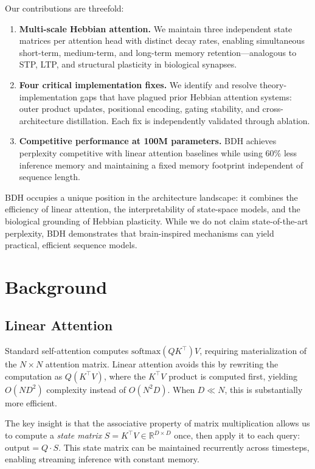 \documentclass{article}
\begin{document}
Our contributions are threefold:

\begin{enumerate}
    \item \textbf{Multi-scale Hebbian attention.} We maintain three independent state matrices per attention head with distinct decay rates, enabling simultaneous short-term, medium-term, and long-term memory retention---analogous to STP, LTP, and structural plasticity in biological synapses.
    \item \textbf{Four critical implementation fixes.} We identify and resolve theory-implementation gaps that have plagued prior Hebbian attention systems: outer product updates, positional encoding, gating stability, and cross-architecture distillation. Each fix is independently validated through ablation.
    \item \textbf{Competitive performance at 100M parameters.} BDH achieves perplexity competitive with linear attention baselines while using 60\% less inference memory and maintaining a fixed memory footprint independent of sequence length.
\end{enumerate}

BDH occupies a unique position in the architecture landscape: it combines the efficiency of linear attention, the interpretability of state-space models, and the biological grounding of Hebbian plasticity. While we do not claim state-of-the-art perplexity, BDH demonstrates that brain-inspired mechanisms can yield practical, efficient sequence models.

\section{Background}

\subsection{Linear Attention}

Standard self-attention computes $\text{softmax}(QK^\top)V$, requiring materialization of the $N \times N$ attention matrix. Linear attention \citep{katharopoulos2018transformers} avoids this by rewriting the computation as $Q(K^\top V)$, where the $K^\top V$ product is computed first, yielding $O(ND^2)$ complexity instead of $O(N^2D)$. When $D \ll N$, this is substantially more efficient.

The key insight is that the associative property of matrix multiplication allows us to compute a \textit{state matrix} $S = K^\top V \in \mathbb{R}^{D \times D}$ once, then apply it to each query: $\text{output} = Q \cdot S$. This state matrix can be maintained recurrently across timesteps, enabling streaming inference with constant memory.
\end{document}
